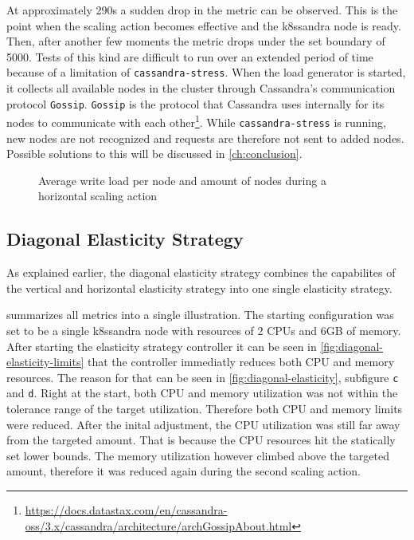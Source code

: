 At approximately 290s a sudden drop in the metric can be observed. This is the point when the scaling action becomes effective and the k8ssandra node is ready. Then, after another few moments the metric drops under the set boundary of 5000. Tests of this kind are difficult to run over an extended period of time because of a limitation of \texttt{cassandra-stress}. When the load generator is started, it collects all available nodes in the cluster through Cassandra's communication protocol \texttt{Gossip}. \texttt{Gossip} is the protocol that Cassandra uses internally for its nodes to communicate with each other\footnote{\raggedright\url{https://docs.datastax.com/en/cassandra-oss/3.x/cassandra/architecture/archGossipAbout.html}}. While \texttt{cassandra-stress} is running, new nodes are not recognized and requests are therefore not sent to added nodes. Possible solutions to this will be discussed in \cref{ch:conclusion}.

\begin{figure}
    \centering
    
    \caption{Average write load per node and amount of nodes during a horizontal scaling action}
    \label{fig:horizontal-elasticity}
\end{figure}

\subsection{Diagonal Elasticity Strategy}

As explained earlier, the diagonal elasticity strategy combines the capabilites of the vertical and horizontal elasticity strategy into one single elasticity strategy.

 summarizes all metrics into a single illustration. The starting configuration was set to be a single k8ssandra node with resources of 2 CPUs and 6GB of memory. After starting the elasticity strategy controller it can be seen in \cref{fig:diagonal-elasticity-limits} that the controller immediatly reduces both CPU and memory resources. The reason for that can be seen in \cref{fig:diagonal-elasticity}, subfigure \texttt{c} and \texttt{d}. Right at the start, both CPU and memory utilization was not within the tolerance range of the target utilization. Therefore both CPU and memory limits were reduced. After the inital adjustment, the CPU utilization was still far away from the targeted amount. That is because the CPU resources hit the statically set lower bounds. The memory utilization however climbed above the targeted amount, therefore it was reduced again during the second scaling action.

